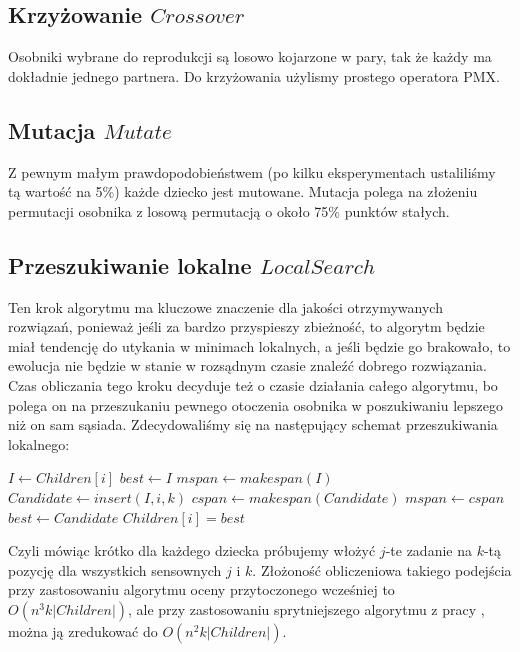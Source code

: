 \documentclass[11pt, a4wide]{article}
\begin{document}
\subsection{Krzyżowanie $Crossover$}
Osobniki wybrane do reprodukcji są losowo kojarzone w pary, tak że każdy ma dokładnie jednego partnera.
Do krzyżowania użylismy prostego operatora PMX.

\subsection{Mutacja $Mutate$}
Z pewnym małym prawdopodobieństwem (po kilku eksperymentach ustaliliśmy tą wartość na 5\%) każde dziecko jest
mutowane. Mutacja polega na złożeniu permutacji osobnika z losową permutacją o około 75\% punktów stałych.

\subsection{Przeszukiwanie lokalne $LocalSearch$}
Ten krok algorytmu ma kluczowe znaczenie dla jakości otrzymywanych rozwiązań, ponieważ jeśli za bardzo przyspieszy
zbieżność, to algorytm będzie miał tendencję do utykania w minimach lokalnych, a jeśli będzie go brakowało, 
to ewolucja nie będzie w stanie w rozsądnym czasie znaleźć dobrego rozwiązania. Czas obliczania tego kroku
decyduje też o czasie działania całego algorytmu, bo polega on na przeszukaniu pewnego otoczenia osobnika
w poszukiwaniu lepszego niż on sam sąsiada. Zdecydowaliśmy się na następujący schemat przeszukiwania lokalnego:
\begin{algorithmic}
    \State $I \gets Children[i]$
    \State $best \gets I$
    \State $mspan \gets makespan(I)$
        \State $Candidate \gets insert(I, i, k)$
        \State $cspan \gets makespan(Candidate)$
          \State $mspan \gets cspan$
          \State $best \gets Candidate$
        \EndIf
      \EndFor
    \EndFor
    \State $Children[i] = best$
  \EndFor
\end{algorithmic}
Czyli mówiąc krótko dla każdego dziecka próbujemy włożyć $j$-te zadanie na $k$-tą pozycję dla 
wszystkich sensownych $j$ i $k$. Złożoność obliczeniowa takiego podejścia przy zastosowaniu algorytmu
oceny przytoczonego wcześniej to $O(n^3k|Children|)$, ale przy zastosowaniu sprytniejszego algorytmu
z pracy \cite{tai90}, można ją zredukować do $O(n^2k|Children|)$.
\end{document}
